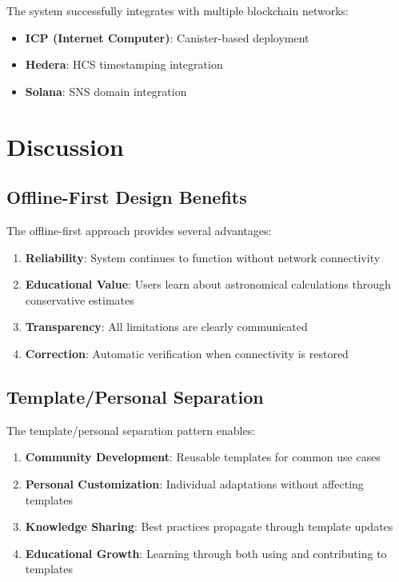 \documentclass[11pt]{article}
\begin{document}
The system successfully integrates with multiple blockchain networks:

\begin{itemize}
    \item \textbf{ICP (Internet Computer)}: Canister-based deployment
    \item \textbf{Hedera}: HCS timestamping integration
    \item \textbf{Solana}: SNS domain integration
\end{itemize}

\section{Discussion}

\subsection{Offline-First Design Benefits}

The offline-first approach provides several advantages:

\begin{enumerate}
    \item \textbf{Reliability}: System continues to function without network connectivity
    \item \textbf{Educational Value}: Users learn about astronomical calculations through conservative estimates
    \item \textbf{Transparency}: All limitations are clearly communicated
    \item \textbf{Correction}: Automatic verification when connectivity is restored
\end{enumerate}

\subsection{Template/Personal Separation}

The template/personal separation pattern enables:

\begin{enumerate}
    \item \textbf{Community Development}: Reusable templates for common use cases
    \item \textbf{Personal Customization}: Individual adaptations without affecting templates
    \item \textbf{Knowledge Sharing}: Best practices propagate through template updates
    \item \textbf{Educational Growth}: Learning through both using and contributing to templates
\end{enumerate}
\end{document}
